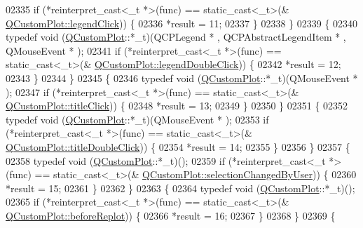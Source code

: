 \begin{DoxyCode}
02335             \textcolor{keywordflow}{if} (*reinterpret\_cast<\_t *>(func) == \textcolor{keyword}{static\_cast<}\_t\textcolor{keyword}{>}(&
      \hyperlink{a00116_a79cff0baafbca10a3aaf694d2d3b9ab3}{QCustomPlot::legendClick})) \{
02336                 *result = 11;
02337             \}
02338         \}
02339         \{
02340             \textcolor{keyword}{typedef} void (\hyperlink{a00030_d8/d00/a00186}{QCustomPlot}::*\_t)(QCPLegend * , QCPAbstractLegendItem * , QMouseEvent 
      * );
02341             \textcolor{keywordflow}{if} (*reinterpret\_cast<\_t *>(func) == \textcolor{keyword}{static\_cast<}\_t\textcolor{keyword}{>}(&
      \hyperlink{a00116_a0250f835c044521df1619b132288bca7}{QCustomPlot::legendDoubleClick})) \{
02342                 *result = 12;
02343             \}
02344         \}
02345         \{
02346             \textcolor{keyword}{typedef} void (\hyperlink{a00030_d8/d00/a00186}{QCustomPlot}::*\_t)(QMouseEvent * );
02347             \textcolor{keywordflow}{if} (*reinterpret\_cast<\_t *>(func) == \textcolor{keyword}{static\_cast<}\_t\textcolor{keyword}{>}(&
      \hyperlink{a00116_a969beb5e4b7e8864e5e349fcda4ce45b}{QCustomPlot::titleClick})) \{
02348                 *result = 13;
02349             \}
02350         \}
02351         \{
02352             \textcolor{keyword}{typedef} void (\hyperlink{a00030_d8/d00/a00186}{QCustomPlot}::*\_t)(QMouseEvent * );
02353             \textcolor{keywordflow}{if} (*reinterpret\_cast<\_t *>(func) == \textcolor{keyword}{static\_cast<}\_t\textcolor{keyword}{>}(&
      \hyperlink{a00116_a854db02b12e8df49b5f998f17e8ee770}{QCustomPlot::titleDoubleClick})) \{
02354                 *result = 14;
02355             \}
02356         \}
02357         \{
02358             \textcolor{keyword}{typedef} void (\hyperlink{a00030_d8/d00/a00186}{QCustomPlot}::*\_t)();
02359             \textcolor{keywordflow}{if} (*reinterpret\_cast<\_t *>(func) == \textcolor{keyword}{static\_cast<}\_t\textcolor{keyword}{>}(&
      \hyperlink{a00116_a500c64a109bc773c973ad274f2fa4190}{QCustomPlot::selectionChangedByUser})) \{
02360                 *result = 15;
02361             \}
02362         \}
02363         \{
02364             \textcolor{keyword}{typedef} void (\hyperlink{a00030_d8/d00/a00186}{QCustomPlot}::*\_t)();
02365             \textcolor{keywordflow}{if} (*reinterpret\_cast<\_t *>(func) == \textcolor{keyword}{static\_cast<}\_t\textcolor{keyword}{>}(&
      \hyperlink{a00116_a0cd30e29b73efd6afe096e44bc5956f5}{QCustomPlot::beforeReplot})) \{
02366                 *result = 16;
02367             \}
02368         \}
02369         \{

\end{DoxyCode}
